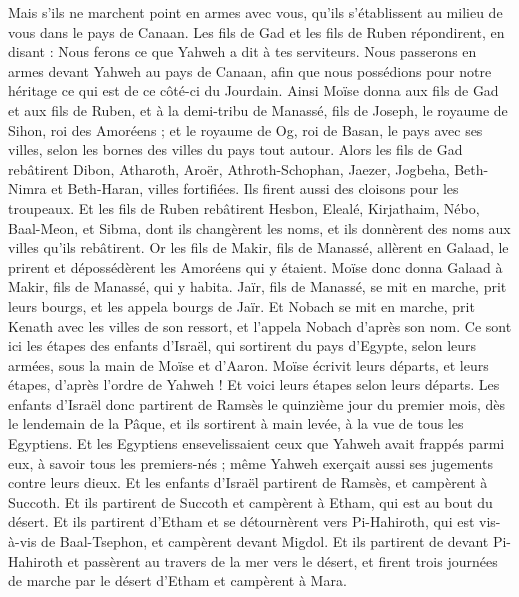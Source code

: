 \begin{multicols}{2}
Mais s'ils ne marchent point en armes avec vous, qu'ils s'établissent au milieu de vous dans le pays de Canaan.
Les fils de Gad et les fils de Ruben répondirent, en disant : Nous ferons ce que Yahweh a dit à tes serviteurs.
Nous passerons en armes devant Yahweh au pays de Canaan, afin que nous possédions pour notre héritage ce qui est de ce côté-ci du Jourdain.
Ainsi Moïse donna aux fils de Gad et aux fils de Ruben, et à la demi-tribu de Manassé, fils de Joseph, le royaume de Sihon, roi des Amoréens ; et le royaume de Og, roi de Basan, le pays avec ses villes, selon les bornes des villes du pays tout autour.
Alors les fils de Gad rebâtirent Dibon, Atharoth, Aroër,
Athroth-Schophan, Jaezer, Jogbeha,
Beth-Nimra et Beth-Haran, villes fortifiées. Ils firent aussi des cloisons pour les troupeaux.
Et les fils de Ruben rebâtirent Hesbon, Elealé, Kirjathaim,
Nébo, Baal-Meon, et Sibma, dont ils changèrent les noms, et ils donnèrent des noms aux villes qu'ils rebâtirent.
Or les fils de Makir, fils de Manassé, allèrent en Galaad, le prirent et dépossédèrent les Amoréens qui y étaient.
Moïse donc  donna Galaad à Makir, fils de Manassé, qui y habita.
Jaïr, fils de Manassé, se mit en marche, prit leurs bourgs, et les appela bourgs de Jaïr.
Et Nobach se mit en marche, prit Kenath avec les villes de son ressort, et l'appela Nobach d'après son nom.
\VerseOne{}Ce sont ici les étapes des enfants d'Israël, qui sortirent du pays d'Egypte, selon leurs armées, sous la main de Moïse et d'Aaron.
Moïse écrivit leurs départs, et leurs étapes, d'après l'ordre de Yahweh ! Et voici leurs étapes selon leurs départs.
Les enfants d'Israël donc partirent de Ramsès le quinzième jour du premier mois, dès le lendemain de la Pâque, et ils sortirent à main levée, à la vue de tous les Egyptiens.
Et les Egyptiens ensevelissaient ceux que Yahweh avait frappés parmi eux, à savoir tous les premiers-nés ; même Yahweh exerçait aussi ses jugements contre leurs dieux.
Et les enfants d'Israël partirent de Ramsès, et campèrent à Succoth.
Et ils partirent de Succoth et campèrent à Etham, qui est au bout du désert.
Et ils partirent d'Etham et se détournèrent vers Pi-Hahiroth, qui est vis-à-vis de Baal-Tsephon, et campèrent devant Migdol.
Et ils partirent de devant Pi-Hahiroth et passèrent au travers de la mer vers le désert, et firent trois journées de marche par le désert d'Etham et campèrent à Mara.

\end{multicols}
